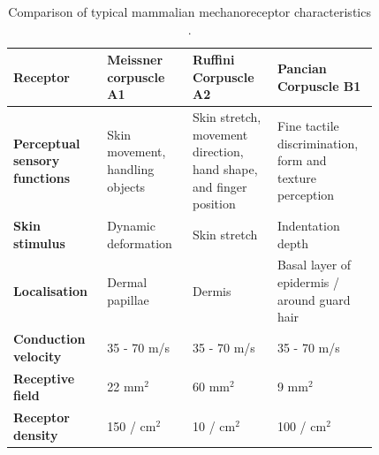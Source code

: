 \begin{table}[H]
    \centering
	\caption{Comparison of typical mammalian mechanoreceptor characteristics \cite{Roudaut2012}.}
	\label{tab:mechanoreceptors-table}
	\begin{tabular}{|p{0.19\linewidth}|p{0.21\linewidth}|p{0.21\linewidth}|p{0.21\linewidth}|} \hline
		\textbf{Receptor} & Meissner corpuscle A1 & Ruffini Corpuscle A2 & Pancian Corpuscle B1 \\ \hline
		\textbf{Perceptual   sensory functions} & Skin movement, handling objects & Skin stretch, movement direction,   hand shape, and finger position & Fine tactile discrimination, form   and texture perception \\ \hline
		\textbf{Skin stimulus} & Dynamic deformation & Skin stretch & Indentation depth \\ \hline
		\textbf{Localisation} & Dermal papillae & Dermis & Basal layer of epidermis / around   guard hair \\ \hline
		\textbf{Conduction velocity} & 35 - 70 m/s & 35 - 70 m/s & 35 - 70 m/s  \\ \hline
		\textbf{Receptive field} & 22 mm$^2$ & 60 mm$^2$ & 9 mm$^2$ \\ \hline
		\textbf{Receptor density} & 150 / cm$^2$ & 10 / cm$^2$ & 100 / cm$^2$ \\ \hline
	\end{tabular}
\end{table}


